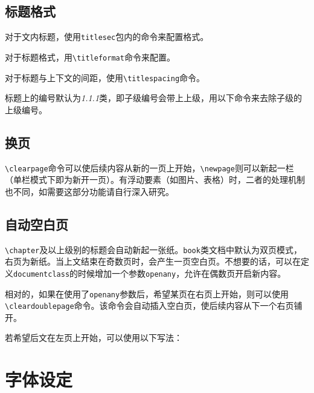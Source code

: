 \documentclass[10pt,openany]{book}
\begin{document}
\begin{sloppypar}
    \section{标题格式}

    对于文内标题，使用\texttt{titlesec}包内的命令来配置格式。

    对于标题格式，用\texttt{\textbackslash{}titleformat}命令来配置。

    

    对于标题与上下文的间距，使用\texttt{\textbackslash{}titlespacing}命令。

    

    标题上的编号默认为\textit{1.1.1}类，即子级编号会带上上级，用以下命令来去除子级的上级编号。

    

    \section{换页}

    \texttt{\textbackslash{}clearpage}命令可以使后续内容从新的一页上开始，\texttt{\textbackslash{}newpage}则可以新起一栏（单栏模式下即为新开一页）。有浮动要素（如图片、表格）时，二者的处理机制也不同，如需要这部分功能请自行深入研究。

    \section{自动空白页}

    \texttt{\textbackslash{}chapter}及以上级别的标题会自动新起一张纸。\texttt{book}类文档中默认为双页模式，右页为新纸。当上文结束在奇数页时，会产生一页空白页。不想要的话，可以在定义\texttt{documentclass}的时候增加一个参数\texttt{openany}，允许在偶数页开启新内容。

    

    相对的，如果在使用了\texttt{openany}参数后，希望某页在右页上开始，则可以使用\texttt{\textbackslash{}cleardoublepage}命令。该命令会自动插入空白页，使后续内容从下一个右页铺开。

    若希望后文在左页上开始，可以使用以下写法：

    

    \chapter{字体设定}


\end{sloppypar}
\end{document}
